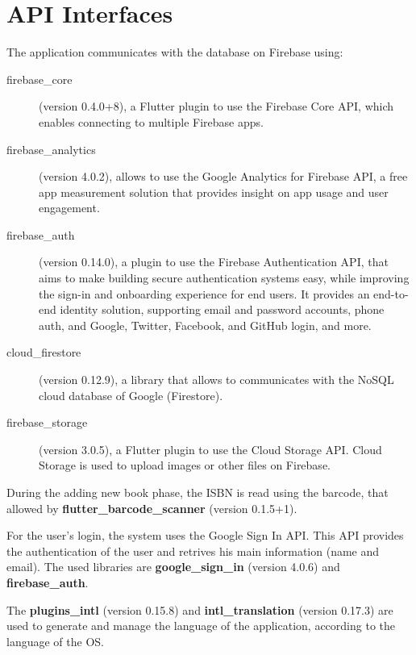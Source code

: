 \section{API Interfaces}
The application communicates with the database on Firebase using:
\begin{description}
    \item
    [firebase\_core] (version 0.4.0+8), a Flutter plugin to use the Firebase Core API, which enables connecting to multiple Firebase apps.
    \item
    [firebase\_analytics] (version 4.0.2), allows to use the Google Analytics for Firebase API, a free app measurement solution that provides insight on app usage and user engagement.
    \item
    [firebase\_auth] (version 0.14.0), a plugin to use the Firebase Authentication API, that aims to make building secure authentication systems easy, while improving the sign-in and onboarding experience for end users. It provides an end-to-end identity solution, supporting email and password accounts, phone auth, and Google, Twitter, Facebook, and GitHub login, and more.
    \item
    [cloud\_firestore] (version 0.12.9), a library that allows to communicates with the NoSQL cloud database of Google (Firestore).
    \item
    [firebase\_storage] (version 3.0.5), a Flutter plugin to use the Cloud Storage API. Cloud Storage is used to upload images or other files on Firebase.
\end{description}
During the adding new book phase, the ISBN is read using the barcode, that allowed by \textbf{flutter\_barcode\_scanner} (version 0.1.5+1).

For the user's login, the system uses the Google Sign In API. This API provides the authentication of the user and retrives his main information (name and email).
The used libraries are \textbf{google\_sign\_in} (version 4.0.6) and \textbf{firebase\_auth}.

The \textbf{plugins\_intl} (version 0.15.8) and \textbf{intl\_translation} (version 0.17.3) are used to generate and manage the language of the application, according to the language of the OS.